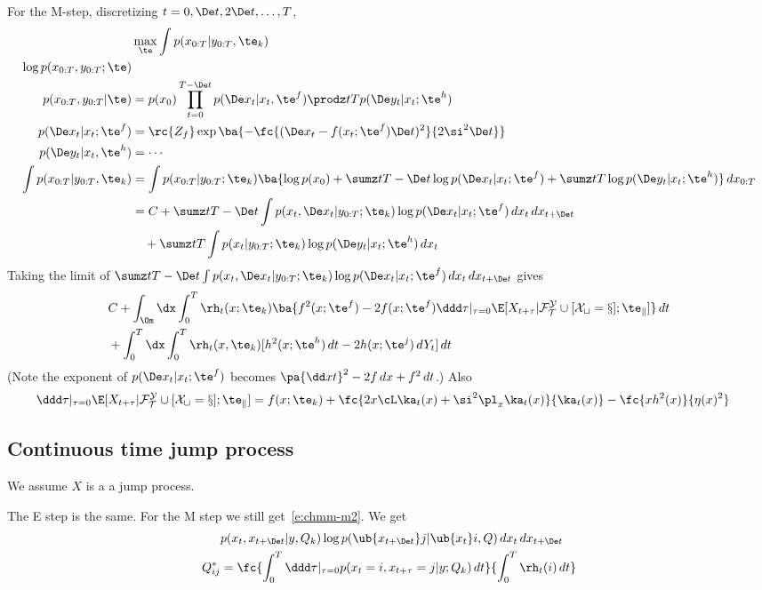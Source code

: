 For the M-step, discretizing $t=0,\De t,2\De t,\ldots, T$,
\begin{align}
&\max_\te\int p(x_{0:T}|y_{0:T},\te_k)\\
\log p(x_{0:T}, y_{0:T};\te)\\
p(x_{0:T},y_{0:T}|\te) &= p(x_0)\prod_{t=0}^{T-\De t} p(\De x_t|x_t,\te^f) \prodz tT p(\De y_t|x_t;\te^h)\\
p(\De x_t|x_t;\te^f) &=\rc{Z_f} \exp\ba{
-\fc{(\De x_t-f(x_t;\te^f)\De t)^2}{2\si^2 \De t}
}\\
p(\De y_t|x_t,\te^h)&=\cdots\\
\int p(x_{0:T}|y_{0:T},\te_k)
&=\int p(x_{0:T}|y_{0:T};\te_k)
\ba{
\log p(x_0)+\sumz t{T-\De t} \log p(\De x_t|x_t;\te^f) + 
\sumz tT\log p(\De y_t|x_t;\te^h)
}\,dx_{0:T}\\
&=C+\sumz t{T-\De t}\int p(x_t,\De x_t | y_{0:T};\te_k) \log p(\De x_t|x_t;\te^f)\,dx_t\,dx_{t+\De t}\\
&\quad + \sumz tT \int p(x_t|y_{0:T}; \te_k) \log p(\De y_t|x_t;\te^h)\,dx_t
\label{e:chmm-m2}
\end{align}
Taking the limit of $\sumz t{T-\De t}\int p(x_t,\De x_t | y_{0:T};\te_k) \log p(\De x_t|x_t;\te^f)\,dx_t\,dx_{t+\De t}$ gives 
\begin{align}
&
C+\int_{\Om} \dx \int_0^T\rh_t(x;\te_k)
\ba{f^2(x;\te^f) - 2f(x;\te^f)
\ddd \tau|_{\tau=0} 
\E[X_{t+\tau}|\cal F_T^Y \cup [X_t=x];\te_k]}\,dt\\
&+\int_0^T\dx \int_0^T \rh_t(x,\te_k) [h^2(x;\te^h) \,dt - 2h (x;\te^j) \,dY_t]\,dt
\end{align}
(Note the exponent of $p(\De x_t|x_t;\te^f)$ becomes $\pa{\dd xt}^2 - 2f\,dx + f^2\,dt$.)
Also
\begin{align}
\ddd \tau|_{\tau=0} 
\E[X_{t+\tau}|\cal F_T^Y \cup [X_t=x];\te_k]
&= f(x;\te_k)+ \fc{2x\cL\ka_t(x)+\si^2 \pl_x\ka_t(x)}{\ka_t(x)}
- \fc{xh^2(x)}{\eta(x)^2}
\end{align}
\subsection{Continuous time jump process}
We assume $X$ is a a jump process.

The E step is the same.
For the M step we still get~\eqref{e:chmm-m2}.
We get
\begin{align}
&
p(x_t,x_{t+\De t}|y,Q_k) \log p(\ub{x_{t+\De t}}j|\ub{x_t}i,Q)\,dx_t\,dx_{t+\De t}\\
Q_{ij}^*
&=\fc{\int_0^T 
\ddd \tau|_{\tau=0} 
p(x_t=i, x_{t+\tau}=j|y;Q_k)\,dt}{\int_0^T\rh_t(i)\,dt}
\end{align}

